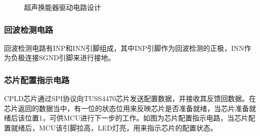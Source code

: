     \begin{figure}[ht]
    	\hfill
    	\hfill
    	\caption{超声换能器驱动电路设计}    %
    	\label{超声换能器驱动电路设计}    %
    \end{figure}


    \subsubsection{回波检测电路}
    回波检测电路有INP和INN引脚组成，其中INP引脚作为回波检测的正极，INN作为负极连接SGND引脚来进行接地。

    \subsubsection{芯片配置指示电路}
    CPLD芯片通过SPI协议向TUSS4470芯片发送配置数据，并接收其反馈回数据。在芯片返回的数据当中，有一位的状态位用来反映芯片是否准备就绪，当芯片准备就绪后该位置1，可供MCU进行下一步的工作。如图为芯片配置指示电路，当芯片配置就绪后，MCU该引脚拉高，LED灯亮，用来指示芯片的配置状态。
    
